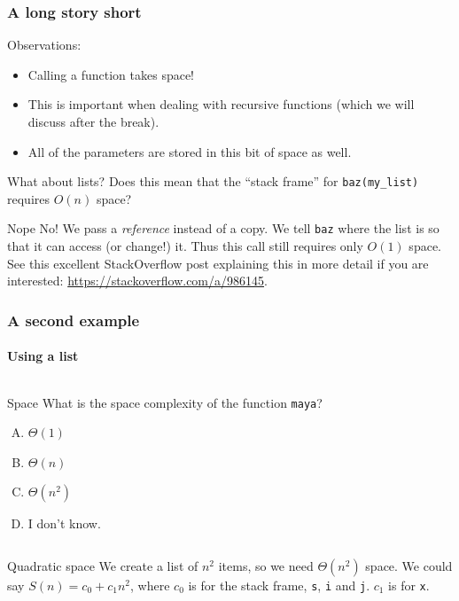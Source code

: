 \begin{frame}
	\frametitle{A long story short}
	
	Observations:
	\begin{itemize}
		\item Calling a function takes space!
		\item This is important when dealing with recursive functions (which we will discuss after the break).
		\item All of the parameters are stored in this bit of space as well.
	\end{itemize}
	\pause
	\begin{questionblock}{What about lists?}
		Does this mean that the ``stack frame'' for \texttt{baz(my\_list)} requires $O(n)$ space?
	\end{questionblock}
	\pause
	\begin{answerblock}{Nope}
		No! We pass a \textit{reference} instead of a copy. We tell \texttt{baz} where the list is so that it can
		access (or change!) it. Thus this call still requires only $O(1)$ space.\\

		{\scriptsize
		See this excellent StackOverflow post explaining this in more detail if you are interested:
	\url{https://stackoverflow.com/a/986145}.}
	\end{answerblock}
\end{frame}

\begin{frame}
	\frametitle{A second example}
	\framesubtitle{Using a list}
	
	\begin{columns}
		
		\pause
		\begin{questionblock}{Space}
			What is the space complexity of the function \texttt{maya}?
			\begin{enumerate}[A.]
				\item $\Theta(1)$
				\item $\Theta(n)$ 
				\item $\Theta(n^2)$
				\item I don't know.
			\end{enumerate}
		\end{questionblock}
	\end{columns}
	\pause
	\begin{answerblock}{Quadratic space}
		We create a list of $n^2$ items, so we need $\Theta(n^2)$ space. We could say $S(n) = c_0 + c_1n^2$, where $c_0$ is
		for the stack frame, \texttt{s}, \texttt{i} and \texttt{j}. $c_1$ is for \texttt{x}.
	\end{answerblock}
\end{frame}

